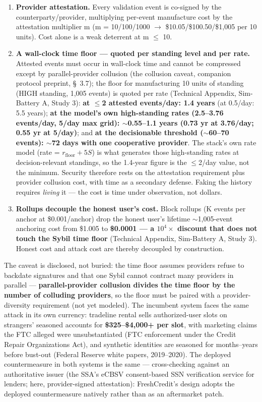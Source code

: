 \documentclass[11pt,twocolumn]{article}
\begin{document}
\begin{enumerate}
\item \textbf{Provider attestation.} Every validation event is co-signed by the counterparty/provider, multiplying per-event manufacture cost by the attestation multiplier m (m = 10/100/1000 $\rightarrow$ \$10.05/\$100.50/\$1,005 per 10 units). Cost alone is a weak deterrent at m $\leq$ 10.
\item \textbf{A wall-clock time floor --- quoted per standing level and per rate.} Attested events must occur in wall-clock time and cannot be compressed except by parallel-provider collusion (the collusion caveat, companion protocol preprint, \S~3.7); the floor for manufacturing 10 units of standing (HIGH standing, 1,005 events) is quoted per rate (Technical Appendix, Sim-Battery A, Study 3): \textbf{at $\leq$2 attested events/day: 1.4 years} (at 0.5/day: 5.5 years); \textbf{at the model's own high-standing rates (2.5--3.76 events/day, 5/day max grid): $\sim$0.55--1.1 years (0.73 yr at 3.76/day; 0.55 yr at 5/day)}; and \textbf{at the decisionable threshold ($\sim$60--70 events): $\sim$72 days with one cooperative provider}. The stack's own rate model (rate = $r_{\mathrm{floor}} + 5S$) is what generates those high-standing rates at decision-relevant standings, so the 1.4-year figure is the $\leq$2/day value, not the minimum. Security therefore rests on the attestation requirement plus provider collusion cost, with time as a secondary defense. Faking the history requires \emph{living} it --- the cost is time under observation, not dollars.
\item \textbf{Rollups decouple the honest user's cost.} Block rollups (K events per anchor at \$0.001/anchor) drop the honest user's lifetime $\sim$1,005-event anchoring cost from \$1.005 to \textbf{\$0.0001 --- a $10^{4}\times$ discount that does not touch the Sybil time floor} (Technical Appendix, Sim-Battery A, Study 3). Honest cost and attack cost are thereby decoupled by construction.
\end{enumerate}

The caveat is disclosed, not buried: the time floor assumes providers refuse to backdate signatures and that one Sybil cannot contract many providers in parallel --- \textbf{parallel-provider collusion divides the time floor by the number of colluding providers}, so the floor must be paired with a provider-diversity requirement (not yet modeled). The incumbent system faces the same attack in its own currency: tradeline rental sells authorized-user slots on strangers' seasoned accounts for \textbf{\$325--\$4,000+ per slot}, with marketing claims the FTC alleged were unsubstantiated (FTC enforcement under the Credit Repair Organizations Act), and synthetic identities are seasoned for months--years before bust-out (Federal Reserve white papers, 2019--2020). The deployed countermeasure in both systems is the same --- cross-checking against an authoritative issuer (the SSA's eCBSV consent-based SSN verification service for lenders; here, provider-signed attestation): FreshCredit's design adopts the deployed countermeasure natively rather than as an aftermarket patch.
\end{document}
